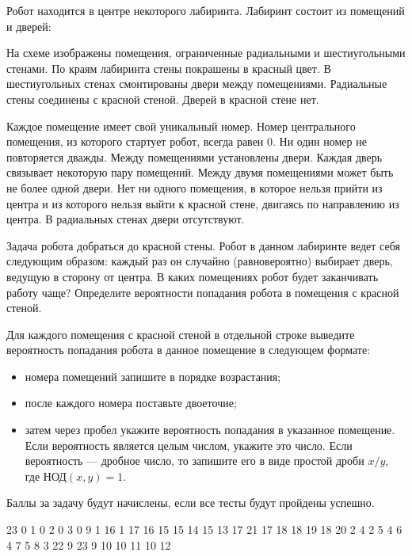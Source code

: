 
Робот находится в центре некоторого лабиринта. Лабиринт состоит из помещений и дверей:


На схеме изображены помещения, ограниченные радиальными и шестиугольными стенами. По краям лабиринта 
стены покрашены в красный цвет. В шестиугольных стенах смонтированы двери между помещениями. Радиальные 
стены соединены с красной стеной. Дверей в красной стене нет.

Каждое помещение имеет свой уникальный номер. Номер центрального помещения, из которого стартует робот, всегда равен 0. Ни один номер не повторяется дважды. Между помещениями установлены двери. Каждая дверь связывает некоторую пару помещений. Между двумя помещениями может быть не более одной двери. Нет ни одного помещения, в которое нельзя прийти из центра и из которого нельзя выйти к красной стене, двигаясь по направлению из центра. В радиальных стенах двери отсутствуют.

Задача робота добраться до красной стены. Робот в данном лабиринте ведет себя следующим образом: каждый раз он случайно (равновероятно) выбирает дверь, ведущую в сторону от центра. В каких помещениях робот будет заканчивать работу чаще? Определите вероятности попадания робота в помещения с красной стеной.

Для каждого помещения с красной стеной в отдельной строке выведите вероятность попадания робота в данное помещение в следующем формате:

\begin{itemize}
    \item номера помещений запишите в порядке возрастания;
    \item после каждого номера поставьте двоеточие;
    \item затем через пробел укажите вероятность попадания в указанное помещение. Если вероятность является целым числом, 
    укажите это число. Если вероятность — дробное число, то запишите его в виде простой дроби $x/y$, \linebreak $\text{где НОД}(x,y)=1$.
\end{itemize}

\markSection

Баллы за задачу будут начислены, если все тесты будут пройдены успешно.


\begin{myverbbox}[\small]{\vinput}
    23
    0 1
    0 2
    0 3
    0 9
    1 16
    1 17
    16 15
    15 14
    15 13
    17 21
    17 18
    18 19
    18 20
    2 4
    2 5
    4 6
    4 7
    5 8
    3 22
    9 23
    9 10
    10 11
    10 12
\end{myverbbox}

